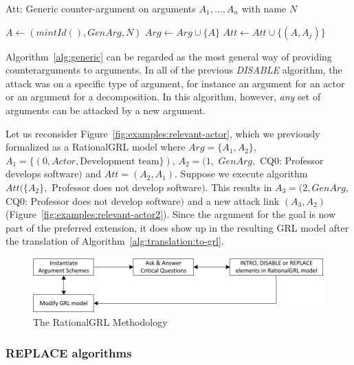 \begin{algorithm}[b]
  \caption{Att: Generic counter-argument on arguments $A_1,\ldots,A_n$ with name $N$}\label{alg:generic}
  \begin{algorithmic}[1]
    \State $A \leftarrow (mintId(),GenArg, N)$\label{alg:generic:arg}
    \State $Arg\leftarrow Arg \cup \{A\}$\label{alg:generic:addarg}
    \label{alg:generic:for}
      \State $Att \leftarrow Att \cup \{(A,A_j)\}$\label{alg:generic:att}
    \EndFor
    \EndProcedure
  \end{algorithmic}
\end{algorithm}

Algorithm~\ref{alg:generic} can be regarded as the most general way of providing counterarguments to arguments. In all of the previous \emph{DISABLE} algorithm, the attack was on a specific type of argument, for instance an argument for an actor or an argument for a decomposition. In this algorithm, however, \emph{any} set of arguments can be attacked by a new argument.

Let us reconsider Figure~\ref{fig:examples:relevant-actor}, which we previously formalized as a RationalGRL model where $Arg=\{A_1,A_2\}$, $A_1 = \{(0,Actor,\text{Development team}\})$, $A_2= (1,$ $GenArg,$ CQ0: Professor develops software$)$ and $Att=(A_2,A_1)$. Suppose we execute algorithm $Att(\{A_2\},$ Professor does not develop software$)$. This results in $A_3=(2, GenArg,$ CQ0: Professor does not develop software$)$ and a new attack link $(A_3,A_2)$ (Figure~\ref{fig:examples:relevant-actor2}). Since the argument for the goal is now part of the preferred extension, it does show up in the resulting GRL model after the translation of Algorithm~\ref{alg:translation:to-grl}.

\begin{figure}[b]
\centering
\includegraphics{img/methodology.pdf}
\caption{The RationalGRL Methodology}
\label{fig:rationalgrl-methodology}
\end{figure}

\subsubsection{REPLACE algorithms}
\label{sect:formalframework:replace}

